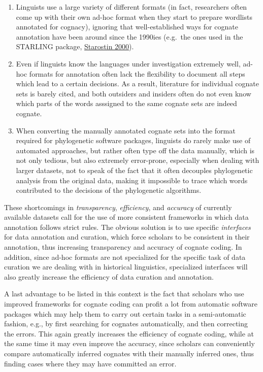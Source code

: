 \documentclass[a4paper,svgnames]{scrartcl}
\providecommand{\tightlist}{%
  \setlength{\itemsep}{0pt}\setlength{\parskip}{0pt}}
\begin{document}
\begin{enumerate}
\def\labelenumi{\arabic{enumi}.}
\tightlist
\item
  Linguists use a large variety of different formats (in fact,
  researchers often come up with their own ad-hoc format when they start
  to prepare wordlists annotated for cognacy), ignoring that
  well-established ways for cognate annotation have been around since
  the 1990ies (e.g.~the ones used in the STARLING package,
  \href{http://bibliography.lingpy.org?key=Starostin2000a}{Starostin
  2000}).
\item
  Even if linguists know the languages under investigation extremely
  well, ad-hoc formats for annotation often lack the flexibility to
  document all steps which lead to a certain decisions. As a result,
  literature for individual cognate sets is barely cited, and both
  outsiders and insiders often do not even know which parts of the words
  asssigned to the same cognate sets are indeed cognate.
\item
  When converting the manually annotated cognate sets into the format
  required for phylogenetic software packages, linguists do rarely make
  use of automated approaches, but rather often type off the data
  manually, which is not only tedious, but also extremely error-prone,
  especially when dealing with larger datasets, not to speak of the fact
  that it often decouples phylogenetic analysis from the original data,
  making it impossible to trace which words contributed to the decisions
  of the phylogenetic algorithms.
\end{enumerate}

These shortcomings in \emph{transparency}, \emph{efficiency}, and
\emph{accuracy} of currently available datasets call for the use of more
consistent frameworks in which data annotation follows strict rules. The
obvious solution is to use specific \emph{interfaces} for data
annotation and curation, which force scholars to be consistent in their
annotation, thus increasing transparency and accuracy of cognate coding.
In addition, since ad-hoc formats are not specialized for the specific
task of data curation we are dealing with in historical linguistics,
specialized interfaces will also greatly increase the efficiency of data
curation and annotation.

A last advantage to be listed in this context is the fact that scholars
who use improved frameworks for cognate coding can profit a lot from
automatic software packages which may help them to carry out certain
tasks in a semi-automatic fashion, e.g., by first searching for cognates
automatically, and then correcting the errors. This again greatly
increases the efficiency of cognate coding, while at the same time it
may even improve the accuracy, since scholars can conveniently compare
automatically inferred cognates with their manually inferred ones, thus
finding cases where they may have committed an error.
\end{document}

